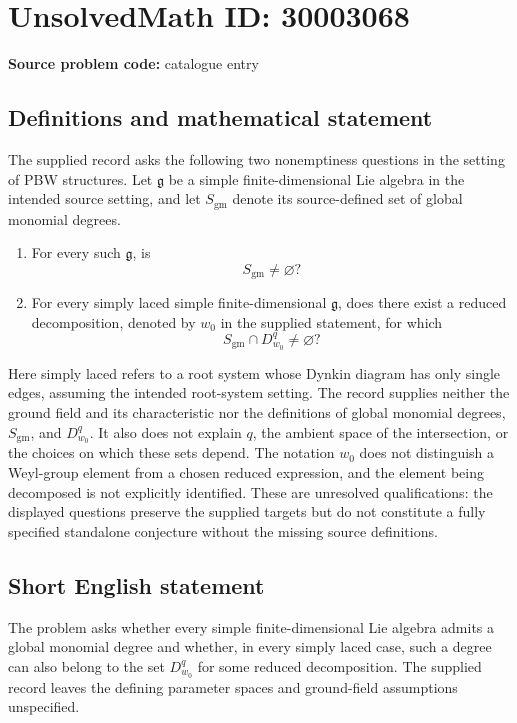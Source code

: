 \documentclass[11pt]{article}
\begin{document}
\section*{UnsolvedMath ID: 30003068}
\textbf{Source problem code:} catalogue entry
\subsection{Definitions and mathematical statement}
The supplied record asks the following two nonemptiness questions in the setting of PBW structures. Let \(\mathfrak g\) be a simple finite-dimensional Lie algebra in the intended source setting, and let \(S_{\mathrm{gm}}\) denote its source-defined set of global monomial degrees.
\begin{enumerate}
\item For every such \(\mathfrak g\), is
\[
S_{\mathrm{gm}}\ne\varnothing?
\]
\item For every simply laced simple finite-dimensional \(\mathfrak g\), does there exist a reduced decomposition, denoted by \(w_0\) in the supplied statement, for which
\[
S_{\mathrm{gm}}\cap D^q_{w_0}\ne\varnothing?
\]
\end{enumerate}
Here simply laced refers to a root system whose Dynkin diagram has only single edges, assuming the intended root-system setting. The record supplies neither the ground field and its characteristic nor the definitions of global monomial degrees, \(S_{\mathrm{gm}}\), and \(D^q_{w_0}\). It also does not explain \(q\), the ambient space of the intersection, or the choices on which these sets depend. The notation \(w_0\) does not distinguish a Weyl-group element from a chosen reduced expression, and the element being decomposed is not explicitly identified. These are unresolved qualifications: the displayed questions preserve the supplied targets but do not constitute a fully specified standalone conjecture without the missing source definitions.
\subsection{Short English statement}
The problem asks whether every simple finite-dimensional Lie algebra admits a global monomial degree and whether, in every simply laced case, such a degree can also belong to the set \(D^q_{w_0}\) for some reduced decomposition. The supplied record leaves the defining parameter spaces and ground-field assumptions unspecified.
\end{document}
